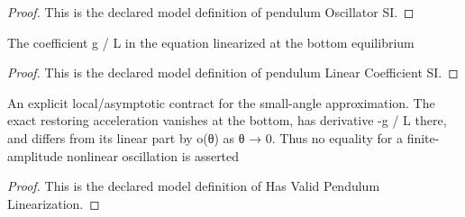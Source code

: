 \begin{proof}
  This is the declared model definition of pendulum Oscillator SI.
\end{proof}
\begin{definition}
  \label{def:physics:phyx-mini-0719:phyxminiproblems-problemphyxmini0719-pendulumlinearcoefficientsi}
  The coefficient g / L in the equation linearized at the bottom equilibrium
\end{definition}
\begin{proof}
  This is the declared model definition of pendulum Linear Coefficient SI.
\end{proof}
\begin{definition}
  \label{def:physics:phyx-mini-0719:phyxminiproblems-problemphyxmini0719-hasvalidpendulumlinearization}
  An explicit local/asymptotic contract for the small-angle approximation. The exact restoring acceleration vanishes at the bottom, has derivative -g / L there, and differs from its linear part by o(θ) as θ → 0. Thus no equality for a finite-amplitude nonlinear oscillation is asserted
\end{definition}
\begin{proof}
  This is the declared model definition of Has Valid Pendulum Linearization.
\end{proof}

